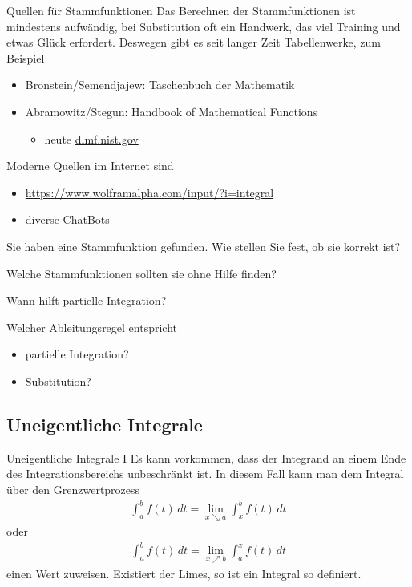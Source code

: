 \begin{frame}{Quellen für Stammfunktionen}
    Das Berechnen der Stammfunktionen ist mindestens aufwändig, bei Substitution oft ein Handwerk, das viel Training und etwas Glück erfordert. Deswegen gibt es seit langer Zeit Tabellenwerke, zum Beispiel
    \begin{itemize}
        \item Bronstein/Semendjajew: Taschenbuch der Mathematik
        \item Abramowitz/Stegun: Handbook of Mathematical Functions
        \begin{itemize}
            \item heute \url{dlmf.nist.gov}
        \end{itemize}
    \end{itemize}
    Moderne Quellen im Internet sind
    \begin{itemize}
        \item \url{https://www.wolframalpha.com/input/?i=integral}
        \item diverse ChatBots
    \end{itemize}
\end{frame}

\begin{Abschluss}
\item Sie haben eine Stammfunktion gefunden. Wie stellen Sie fest, ob sie korrekt ist?
\item Welche Stammfunktionen sollten sie ohne Hilfe finden?
\item Wann hilft partielle Integration?
\item Welcher Ableitungsregel entspricht
  \begin{itemize}
  \item partielle Integration?
  \item Substitution?
  \end{itemize}
\end{Abschluss}

\subsection{Uneigentliche Integrale}
\begin{frame}{Uneigentliche Integrale I}
    Es kann vorkommen, dass der Integrand an einem Ende des Integrationsbereichs unbeschränkt ist. In diesem Fall kann man dem Integral über den Grenzwertprozess
    \begin{gather*}
        \int_a^b f(t)\,dt = \lim_{x\searrow a} \int_x^b f(t)\,dt
    \end{gather*}
    oder
    \begin{gather*}
        \int_a^b f(t)\,dt = \lim_{x\nearrow b} \int_a^x f(t)\,dt
    \end{gather*}
    einen Wert zuweisen. Existiert der Limes, so ist ein Integral so definiert.
\end{frame}

